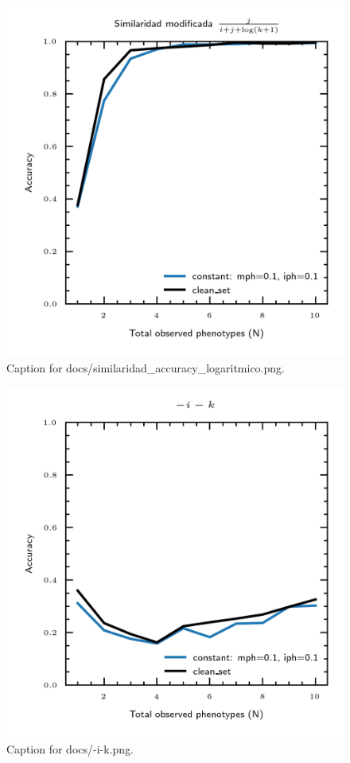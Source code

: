\documentclass{article}
\begin{document}
\begin{figure}[h] \centering \includegraphics{docs/similaridad_accuracy_logaritmico.png} \caption{Caption for docs/similaridad_accuracy_logaritmico.png.} \end{figure}
\begin{figure}[h] \centering \includegraphics{docs/-i-k.png} \caption{Caption for docs/-i-k.png.} \end{figure}
\end{document}
